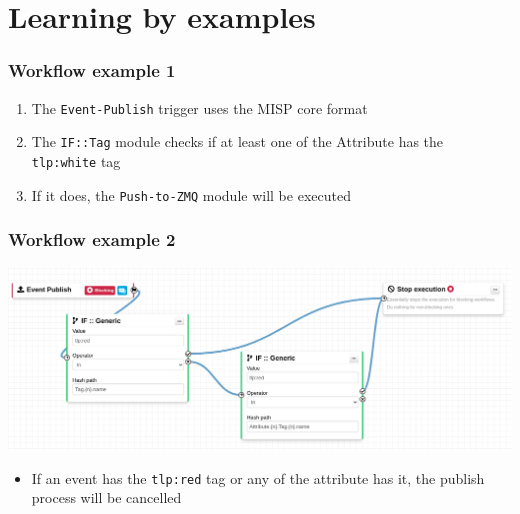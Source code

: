\section{Learning by examples}
\begin{frame}
    \frametitle{Workflow example 1}
    \begin{center}
    \end{center}

    \begin{enumerate}
        \item The \texttt{Event-Publish} trigger uses the MISP core format
        \item The \texttt{IF::Tag} module checks if at least one of the Attribute has the \texttt{tlp:white} tag
        \item If it does, the \texttt{Push-to-ZMQ} module will be executed
    \end{enumerate}
\end{frame}

\begin{frame}
    \frametitle{Workflow example 2}
    \begin{center}
        \includegraphics[width=1.0\linewidth]{pictures/example-2a.png}
    \end{center}

    \begin{itemize}
        \item If an event has the \texttt{tlp:red} tag or any of the attribute has it, the publish process will be cancelled
    \end{itemize}
\end{frame}


